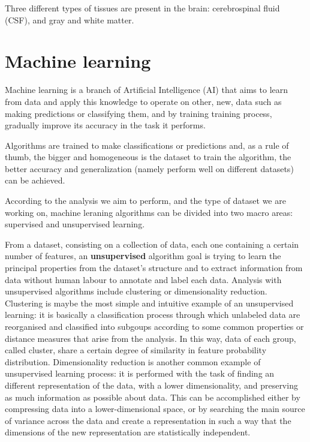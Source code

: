 \documentclass[12pt]{report}
\begin{document}
Three different types of tissues are present in the brain: cerebrospinal fluid (CSF), and gray and white matter.

\chapter{Machine learning}

Machine learning is a branch of Artificial Intelligence (AI) that aims to learn from data and apply this knowledge to operate on other, new, data such as making predictions or classifying them, and by training training process, gradually improve its accuracy in the task it performs.

Algorithms are trained to make classifications or predictions and, as a rule of thumb, the bigger and homogeneous is the dataset to train the algorithm, the better accuracy and generalization (namely perform well on different datasets) can be achieved.

According to the analysis we aim to perform, and the type of dataset we are working on, machine leraning algorithms can be divided into two macro areas: supervised and unsupervised learning.

From a dataset, consisting on a collection of data, each one containing a certain number of features, an \textbf{unsupervised} algorithm goal is trying to learn the principal properties from the dataset's structure and to extract information from data without human labour to annotate and label each data.
Analysis with unsupervised algorithms include clustering or dimensionality reduction.
Clustering is maybe the most simple and intuitive example of an unsupervised learning: it is basically a classification process through which unlabeled data are reorganised and classified into subgoups according to some common properties or distance measures that arise from the analysis.
In this way, data of each group, called cluster, share a certain degree of similarity in feature probability distribution.
Dimensionality reduction is another common example of unsupervised learning process: it is performed with the task of finding an different representation of the data, with a lower dimensionality, and preserving as much information as possible about data.
This can be accomplished either by compressing data into a lower-dimensional space, or by searching the main source of variance across the data and create a representation in such a way that the dimensions of the new representation are statistically independent.
\end{document}
